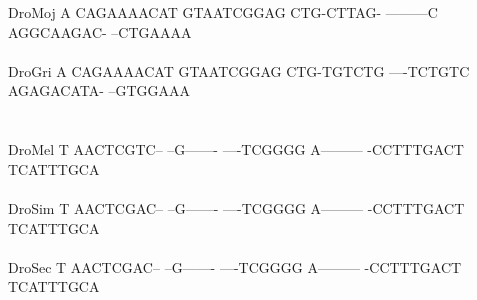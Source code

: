 \documentclass[11pt,twoside,reqno,a4paper]{article}
\begin{document}
{DroMoj	A	CAGAAAACAT	GTAATCGGAG	CTG-CTTAG-	---------C	AGGCAAGAC-	--CTGAAAA\\
\hspace*{7\charwidth}\hspace*{1\charwidth}\hspace*{1\charwidth}\hspace*{1\charwidth}\hspace*{1\charwidth}\hspace*{1\charwidth}\hspace*{1\charwidth}\\
DroGri	A	CAGAAAACAT	GTAATCGGAG	CTG-TGTCTG	----TCTGTC	AGAGACATA-	--GTGGAAA\\
\hspace*{7\charwidth}\hspace*{1\charwidth}\hspace*{1\charwidth}\hspace*{1\charwidth}\hspace*{1\charwidth}\hspace*{1\charwidth}\hspace*{1\charwidth}\\
\\
DroMel	T	AACTCGTC--	--G-------	----TCGGGG	A---------	-CCTTTGACT	TCATTTGCA\\
\hspace*{7\charwidth}\hspace*{1\charwidth}\hspace*{1\charwidth}\hspace*{1\charwidth}\hspace*{1\charwidth}\hspace*{1\charwidth}\hspace*{1\charwidth}\\
DroSim	T	AACTCGAC--	--G-------	----TCGGGG	A---------	-CCTTTGACT	TCATTTGCA\\
\hspace*{7\charwidth}\hspace*{1\charwidth}\hspace*{1\charwidth}\hspace*{1\charwidth}\hspace*{1\charwidth}\hspace*{1\charwidth}\hspace*{1\charwidth}\\
DroSec	T	AACTCGAC--	--G-------	----TCGGGG	A---------	-CCTTTGACT	TCATTTGCA\\
\hspace*{7\charwidth}\hspace*{1\charwidth}\hspace*{1\charwidth}\hspace*{1\charwidth}\hspace*{1\charwidth}\hspace*{1\charwidth}\hspace*{1\charwidth}\\
}
\end{document}
